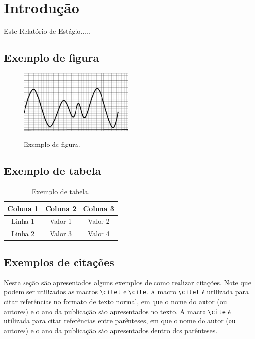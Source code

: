 \chapter{Introdução}
\label{cap:introducao}

Este Relatório de Estágio.....

\section{Exemplo de figura}

\begin{figure}[ht]
	\centering
	\caption{Exemplo de figura.}
	\includegraphics[width=0.5\textwidth]{fig/figexemplo.eps}
	\label{fig:figexemplo}
\end{figure}


\section{Exemplo de tabela}

\begin{table}[ht]
	\centering
	\caption{Exemplo de tabela.}
	\label{tab:exemplo}
	\begin{tabular}{|c|c|c|}
		\hline
		\textbf{Coluna 1} & \textbf{Coluna 2} & \textbf{Coluna 3} \\ \hline
		Linha 1 & Valor 1 & Valor 2 \\ \hline
		Linha 2 & Valor 3 & Valor 4 \\ \hline
	\end{tabular}
\end{table}

\section{Exemplos de citações}

Nesta seção são apresentados alguns exemplos de como realizar citações. Note que podem ser utilizados as macros \verb|\citet| e \verb|\cite|. A macro \verb|\citet| é utilizada para citar referências no formato de texto normal, em que o nome do autor (ou autores) e o ano da publicação são apresentados no texto. A macro \verb|\cite| é utilizada para citar referências entre parênteses, em que o nome do autor (ou autores) e o ano da publicação são apresentados dentro dos parênteses.

